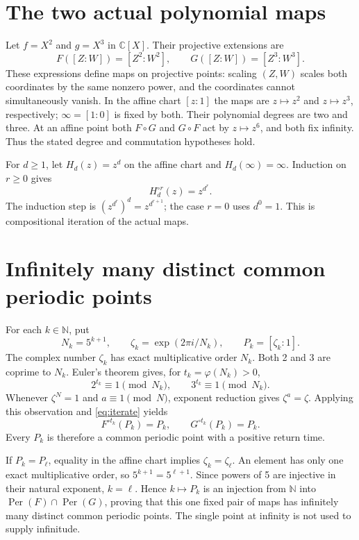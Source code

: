 \documentclass[11pt]{article}
\newcommand{\C}{\mathbb C}
\newcommand{\N}{\mathbb N}
\newcommand{\Per}{\operatorname{Per}}
\begin{document}
\section{The two actual polynomial maps}
Let $f=X^2$ and $g=X^3$ in $\C[X]$. Their projective extensions are
\[
 F([Z:W])=[Z^2:W^2],\qquad G([Z:W])=[Z^3:W^3].
\]
These expressions define maps on projective points: scaling $(Z,W)$ scales
both coordinates by the same nonzero power, and the coordinates cannot
simultaneously vanish. In the affine chart $[z:1]$ the maps are $z\mapsto z^2$
and $z\mapsto z^3$, respectively; $\infty=[1:0]$ is fixed by both.
Their polynomial degrees are two and three. At an affine point both
$F\circ G$ and $G\circ F$ act by $z\mapsto z^6$, and both fix infinity.
Thus the stated degree and commutation hypotheses hold.

For $d\geq1$, let $H_d(z)=z^d$ on the affine chart and $H_d(\infty)=\infty$.
Induction on $r\geq0$ gives
\begin{equation}\label{eq:iterate}
 H_d^{\circ r}(z)=z^{d^r}.
\end{equation}
The induction step is $(z^{d^r})^d=z^{d^{r+1}}$; the case $r=0$ uses
$d^0=1$. This is compositional iteration of the actual maps.

\section{Infinitely many distinct common periodic points}
For each $k\in\N$, put
\[
 N_k=5^{k+1},\qquad \zeta_k=\exp(2\pi i/N_k),\qquad P_k=[\zeta_k:1].
\]
The complex number $\zeta_k$ has exact multiplicative order $N_k$.
Both 2 and 3 are coprime to $N_k$. Euler's theorem gives, for
$t_k=\varphi(N_k)>0$,
\[
 2^{t_k}\equiv1\pmod {N_k},\qquad
 3^{t_k}\equiv1\pmod {N_k}.
\]
Whenever $\zeta^{N}=1$ and $a\equiv1\pmod N$, exponent reduction gives
$\zeta^a=\zeta$. Applying this observation and \eqref{eq:iterate} yields
\[
 F^{\circ t_k}(P_k)=P_k,
 \qquad G^{\circ t_k}(P_k)=P_k.
\]
Every $P_k$ is therefore a common periodic point with a positive return time.

If $P_k=P_\ell$, equality in the affine chart implies
$\zeta_k=\zeta_\ell$. An element has only one exact multiplicative order,
so $5^{k+1}=5^{\ell+1}$. Since powers of 5 are injective in their natural
exponent, $k=\ell$. Hence $k\mapsto P_k$ is an injection from $\N$ into
$\Per(F)\cap\Per(G)$, proving that this one fixed pair of maps has infinitely
many distinct common periodic points. The single point at infinity is not
used to supply infinitude.
\end{document}
